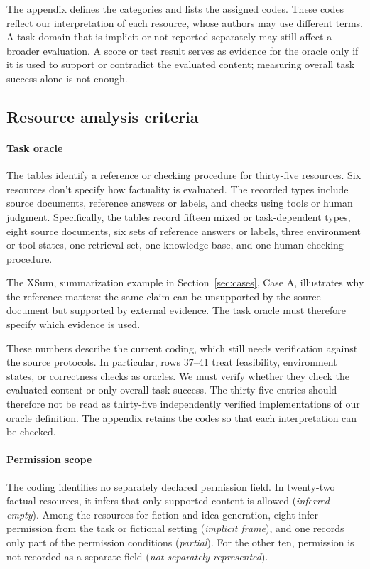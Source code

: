 \documentclass{clv2025}
\begin{document}
The appendix defines the categories and lists the assigned codes. These
codes reflect our interpretation of each resource, whose authors may use
different terms. A task domain that is implicit or not reported separately may
still affect a broader evaluation. A score or test result serves as evidence
for the oracle only if it is used to support or contradict the evaluated
content; measuring overall task success alone is not enough.

\subsection{Resource analysis criteria}\label{sec:mapping}

\paragraph{Task oracle}
The tables identify a reference or checking procedure for thirty-five
resources. Six resources don't specify how factuality is evaluated.  The recorded types include source documents, reference answers or
labels, and checks using tools or human judgment. Specifically, the tables
record fifteen mixed or task-dependent types, eight source documents, six
sets of reference answers or labels, three environment or tool states, one
retrieval set, one knowledge base, and one human checking procedure.

The XSum, summarization example in Section~\ref{sec:cases}, Case A,  illustrates why the reference
matters: the same claim can be unsupported by the source document but
supported by external evidence. The task oracle must therefore specify
which evidence is used.

These numbers describe the current coding, which still needs verification
against the source protocols. In particular, rows 37--41 treat feasibility,
environment states, or correctness checks as oracles. We must verify whether
they check the evaluated content or only overall task success. The
thirty-five entries should therefore not be read as thirty-five independently
verified implementations of our oracle definition. The appendix retains the
codes so that each interpretation can be checked.

\paragraph{Permission scope}
The coding identifies no separately declared permission field. In twenty-two
factual resources, it infers that only supported content is allowed
(\emph{inferred empty}). Among the resources for fiction and idea generation,
eight infer permission from the task or fictional setting
(\emph{implicit frame}), and one records only part of the permission conditions
(\emph{partial}). For the other ten, permission is not recorded as a separate
field (\emph{not separately represented}).
\end{document}
